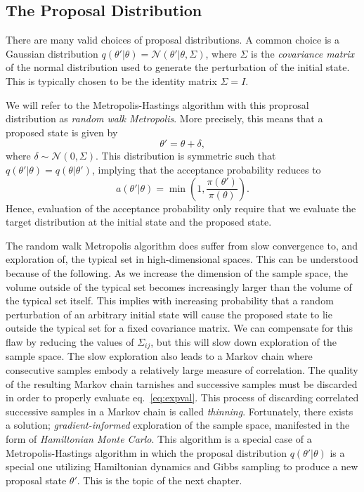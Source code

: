 \subsection{The Proposal Distribution}
There are many valid choices of proposal distributions. A common choice is a Gaussian distribution $q(\theta'|\theta) = \mathcal{N}(\theta'|\theta, \Sigma)$,
where $\Sigma$ is the \textit{covariance matrix} of the normal distribution used to generate the perturbation of the initial state.
This is typically chosen to be the identity matrix $\Sigma = I$.

We will refer to the Metropolis-Hastings algorithm with this proprosal distribution as \textit{random walk Metropolis}.
More precisely, this means that a proposed state is given by
\begin{equation}
  \theta' = \theta + \delta,
\end{equation}
where $\delta \sim \mathcal{N}(0, \Sigma)$. This distribution is symmetric such that $q(\theta'|\theta) = q(\theta|\theta')$, implying that the acceptance probability
reduces to
\begin{equation}\label{eq:symmetric_acceptance_prob}
    a(\theta'|\theta) = \min \left(1, \frac{\pi(\theta')}{\pi(\theta)}\right).
\end{equation}
Hence, evaluation of the acceptance probability only require that we evaluate the target distribution at the initial state and the proposed state.

The random walk Metropolis algorithm does suffer from slow convergence to, and exploration of, the typical set in high-dimensional spaces.
This can be understood because of the following. 
As we increase the dimension of the sample space, the volume outside of the typical set becomes increasingly larger than the volume of the typical set itself.
This implies with increasing probability that a random perturbation of an arbitrary initial state will cause the proposed state
to lie outside the typical set for a fixed covariance matrix.
We can compensate
for this flaw by reducing the values of $\Sigma_{ij}$, but this will slow down exploration of the
sample space. The slow exploration also leads to a Markov chain where consecutive
samples embody
a relatively large measure of correlation. 
The quality of the resulting Markov chain tarnishes and successive samples must be discarded in order to properly evaluate eq.~\eqref{eq:expval}.
This process of discarding correlated successive samples in a Markov chain is called \textit{thinning}.
Fortunately, there exists a solution; \textit{gradient-informed} exploration of the sample space, manifested in
the form of \textit{Hamiltonian Monte Carlo}. This algorithm is a special case of a Metropolis-Hastings algorithm
in which the proposal distribution $q(\theta'|\theta)$ is a special one utilizing Hamiltonian dynamics and Gibbs sampling
to produce a new proposal state $\theta'$. This is the topic of the next chapter.

